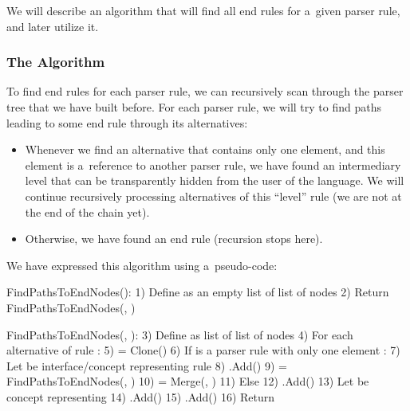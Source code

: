 We will describe an algorithm that will find all end rules for a~given parser rule, and later utilize it.

\subsubsection{The Algorithm}
To find end rules for each parser rule, we can recursively scan through the parser tree that we have built before.
For each parser rule, we will try to find paths leading to some end rule through its alternatives:

\begin{itemize}
	\item Whenever we find an alternative that contains only one element, and this element is a~reference to another parser rule, we have found an intermediary level that can be transparently hidden from the user of the language.
	We will continue recursively processing alternatives of this “level” rule (we are not at the end of the chain yet).

	\item Otherwise, we have found an end rule (recursion stops here).
\end{itemize}

We have expressed this algorithm using a~pseudo-code:

\label{chap:shortcut_algorithm}
\begin{antlr}
	FindPathsToEndNodes():
	1)  Define  as an empty list of list of nodes
	2)  Return FindPathsToEndNodes(, )

	FindPathsToEndNodes(, ):
	3)  Define  as list of list of nodes
	4)  For each alternative  of rule :
	5)       = Clone()
	6)      If  is a parser rule with only one element :
	7)          Let  be interface/concept representing rule 
	8)          .Add()
	9)           = FindPathsToEndNodes(, )
	10)          = Merge(, )
	11)     Else
	12)         .Add()
	13)         Let  be concept representing 
	14)         .Add()
	15)         .Add()
	16) Return 
\end{antlr}

